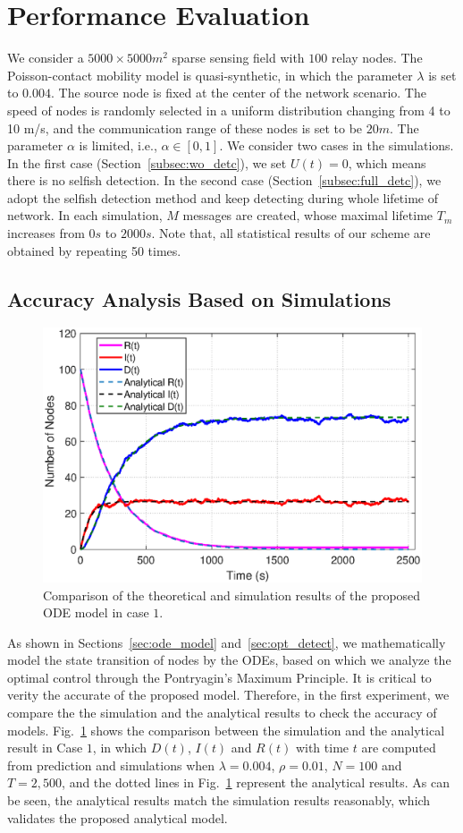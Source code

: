 \section{Performance Evaluation}
\label{sec:pe}
We consider a $5000 \times 5000 m^2$ sparse sensing field with
$100$ relay nodes.
The Poisson-contact
mobility model is quasi-synthetic,
in which the parameter $\lambda$ is set to $0.004$.
The source node is fixed at the center of the network scenario. 
The speed of nodes is randomly selected in a uniform distribution 
changing from 4 to 10 m/s,
and the communication range of these nodes is set to be $20$$m$.
The parameter $\alpha$ is limited, 
i.e.,
$\alpha \in [0, 1]$.
We consider two cases in the simulations.
In the first case (Section~\ref{subsec:wo_detc}),
we set $U(t)=0$,
which means there is no selfish detection. 
In the second case (Section~\ref{subsec:full_detc}),
we adopt the selfish detection method and keep detecting during whole lifetime of network.
In each simulation,
$M$ messages are created,
whose maximal lifetime $T_m$ increases from $0$$s$ to $2000$$s$.
Note that,
all statistical results of our scheme are obtained by
repeating 50 times.

\subsection{Accuracy Analysis Based on Simulations}
\label{subsec:pe_valid}
\begin{figure}
  \includegraphics[width=.45\textwidth]{fig/twohop_without_detection.eps}
  \caption{Comparison of the theoretical and simulation results of the proposed ODE model in  case $1$.}
  \label{fig:twohop_predict_wod}
\end{figure}
As shown in Sections~\ref{sec:ode_model} and~\ref{sec:opt_detect},
we mathematically model the state transition of nodes by the ODEs,
based on which we analyze the optimal control through the Pontryagin's Maximum Principle.
It is critical to verity the accurate of the proposed model.
Therefore, 
in the first experiment,
we compare the the simulation and the analytical results to check the accuracy of models.
Fig.~\ref{fig:twohop_predict_wod} shows 
the comparison between the simulation and the analytical result in Case $1$, 
in which $D(t)$, $I(t)$ and $R(t)$ with time $t$ are computed from prediction and simulations
when $\lambda = 0.004$, $\rho = 0.01$, $N=100$ and $T=2,500$,
and the dotted lines in Fig.~\ref{fig:twohop_predict_wod} represent the analytical results.
As can be seen,
the analytical results match the simulation results reasonably,
which validates the proposed analytical model.

